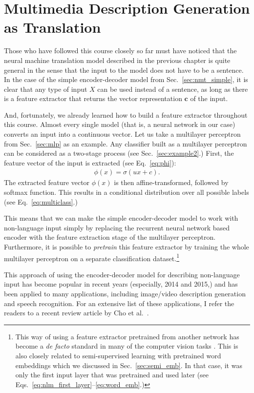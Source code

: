 \documentclass{report}
\newcommand{\vect}[1]{\mathbf{#1}}
\newcommand{\vc}[0]{\vect{c}}
\begin{document}
\section{Multimedia Description Generation as Translation}

Those who have followed this course closely so far must have noticed that the
neural machine translation model described in the previous chapter is quite
general in the sense that the input to the model does not have to be a sentence.
In the case of the simple encoder-decoder model from Sec.~\ref{sec:nmt_simple},
it is clear that any type of input $X$ can be used instead of a sentence, as
long as there is a feature extractor that returns the vector representation
$\vc$ of the input.

And, fortunately, we already learned how to build a feature extractor throughout
this course. Almost every single model (that is, a neural network in our case)
converts an input into a continuous vector. Let us take a multilayer perceptron
from Sec.~\ref{sec:mlp} as an example. Any classifier built as a multilayer
perceptron can be considered as a two-stage process (see
Sec.~\ref{sec:example2}.) First, the feature vector of the input is extracted
(see Eq.~\eqref{eq:phi}):
\begin{align*}
    \phi(x) = \sigma(u x + c).
\end{align*}
The extracted feature vector $\phi(x)$ is then affine-transformed, followed by
softmax function. This results in a conditional distribution over all possible
labels (see Eq.~\eqref{eq:multiclass}.)

This means that we can make the simple encoder-decoder model to work with
non-language input simply by replacing the recurrent neural network based
encoder with the feature extraction stage of the multilayer perceptron.
Furthermore, it is possible to {\em pretrain} this feature extractor by training
the whole multilayer perceptron on a separate classification dataset.\footnote{
    This way of using a feature extractor pretrained from another network has
    become a {\em de facto} standard in many of the computer vision tasks
    \cite{sermanet2013overfeat}. This
    is also closely related to semi-supervised learning with pretrained word
    embeddings which we discussed in Sec.~\ref{sec:semi_emb}. In that case, it
    was only the first input layer that was pretrained and used later (see
    Eqs.~\eqref{eq:nlm_first_layer}--\eqref{eq:word_emb}.)
}

This approach of using the encoder-decoder model for describing non-language
input has become popular in recent years (especially, 2014 and 2015,) and has
been applied to many applications, including image/video description generation
and speech recognition. For an extensive list of these applications, I refer the
readers to a recent review article by Cho et al.~\cite{cho2015describing}.
\end{document}
